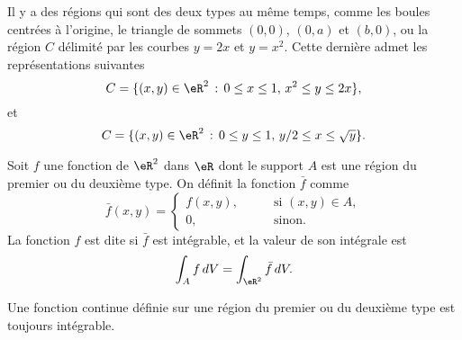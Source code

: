 \begin{example}
	Il y a des régions qui sont des deux types au même temps, comme les boules centrées à l'origine, le triangle de sommets  \( (0,0)\), \( (0,a)\) et \( (b,0)\), ou la région \( C\) délimité par les courbes \( y=2x\) et \( y=x^2\). Cette dernière admet les représentations suivantes
	\[
		C= \{(x,y)\in\eR^2 \,:\, 0\leq x\leq 1, \, x^2\leq y\leq 2x\},
	\]
	et
	\[
		C= \{(x,y)\in\eR^2 \,:\, 0\leq y\leq 1, \, y/2\leq x\leq \sqrt{y}\}.
	\]
\end{example}
\begin{definition}
	Soit \( f\) une fonction de \( \eR^2\) dans \( \eR\) dont le support  \( A\) est une région du premier ou du deuxième type. On définit la fonction \( \bar f\) comme
	\begin{equation}
		\bar f(x,y) = \left\{ \begin{array}{ll}
			f(x,y), \qquad & \textrm{si } (x,y)\in A, \\
			0 ,            & \textrm{sinon.}
		\end{array}\right.
	\end{equation}
	La fonction \( f\) est dite  si \( \bar f\) est intégrable, et la valeur de son intégrale est
	\[
		\int_A f\, dV=\int_{\eR^2} \bar f\, dV.
	\]
\end{definition}
Une fonction continue définie sur une région du premier ou du deuxième type est toujours intégrable.

